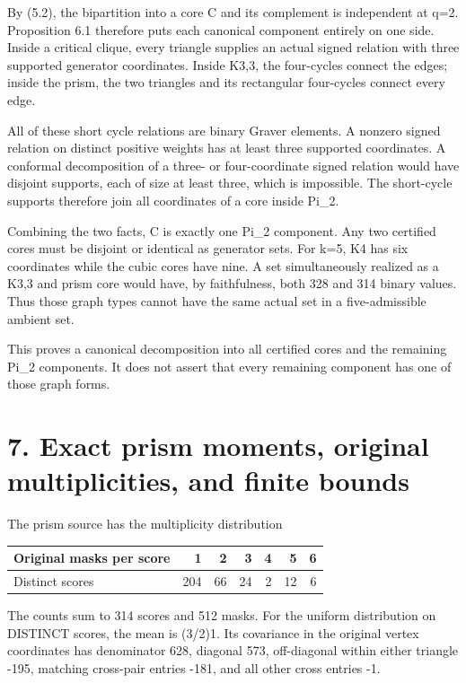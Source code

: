By (5.2), the bipartition into a core C and its complement is independent at q=2. Proposition 6.1 therefore puts each canonical component entirely on one side. Inside a critical clique, every triangle supplies an actual signed relation with three supported generator coordinates. Inside K3,3, the four-cycles connect the edges; inside the prism, the two triangles and its rectangular four-cycles connect every edge.

All of these short cycle relations are binary Graver elements. A nonzero signed relation on distinct positive weights has at least three supported coordinates. A conformal decomposition of a three- or four-coordinate signed relation would have disjoint supports, each of size at least three, which is impossible. The short-cycle supports therefore join all coordinates of a core inside Pi\_2.

Combining the two facts, C is exactly one Pi\_2 component. Any two certified cores must be disjoint or identical as generator sets. For k=5, K4 has six coordinates while the cubic cores have nine. A set simultaneously realized as a K3,3 and prism core would have, by faithfulness, both 328 and 314 binary values. Thus those graph types cannot have the same actual set in a five-admissible ambient set.

This proves a canonical decomposition into all certified cores and the remaining Pi\_2 components. It does not assert that every remaining component has one of those graph forms.

\section{7. Exact prism moments, original multiplicities, and finite bounds}\label{n18-exact-prism-moments-original-multiplicities-and-finite-bounds}

The prism source has the multiplicity distribution

\begin{longtable}[]{@{}lrrrrrr@{}}
\toprule\noalign{}
Original masks per score & 1 & 2 & 3 & 4 & 5 & 6 \\
\midrule\noalign{}
\endhead
\bottomrule\noalign{}
\endlastfoot
Distinct scores & 204 & 66 & 24 & 2 & 12 & 6 \\
\end{longtable}

The counts sum to 314 scores and 512 masks. For the uniform distribution on DISTINCT scores, the mean is (3/2)1. Its covariance in the original vertex coordinates has denominator 628, diagonal 573, off-diagonal within either triangle -195, matching cross-pair entries -181, and all other cross entries -1.

